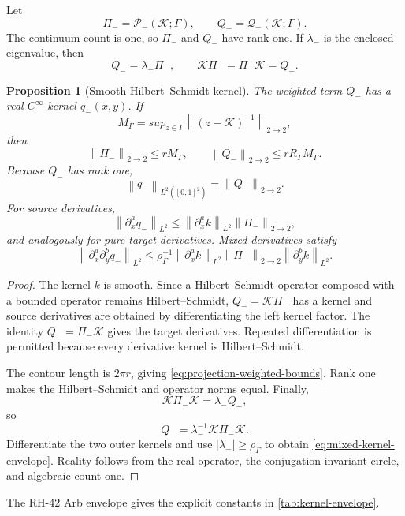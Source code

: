 \documentclass[11pt]{article}
\newtheorem{proposition}[theorem]{Proposition}
\theoremstyle{definition}
\theoremstyle{remark}
\newcommand{\cK}{\mathcal K}
\newcommand{\cQ}{\mathcal Q}
\newcommand{\cP}{\mathcal P}
\newcommand{\norm}[1]{\left\lVert #1\right\rVert}
\begin{document}
Let
\[
 \Pi_-=\cP_-(\cK;\Gamma),
 \qquad Q_-=\cQ_-(\cK;\Gamma).
\]
The continuum count is one, so $\Pi_-$ and $Q_-$ have rank one.  If
$\lambda_-$ is the enclosed eigenvalue, then
\begin{equation}
 Q_-=\lambda_-\Pi_-,
 \qquad
 \cK\Pi_-=\Pi_-\cK=Q_-.
 \label{eq:spectral-identities}
\end{equation}

\begin{proposition}[Smooth Hilbert--Schmidt kernel]
\label{prop:smooth-kernel}
The weighted term $Q_-$ has a real $C^\infty$ kernel $q_-(x,y)$.  If
\[
 M_\Gamma=sup_{z\in\Gamma}\norm{(z-\cK)^{-1}}_{2\to2},
\]
then
\begin{equation}
 \norm{\Pi_-}_{2\to2}\le rM_\Gamma,
 \qquad
 \norm{Q_-}_{2\to2}\le rR_\Gamma M_\Gamma.
 \label{eq:projection-weighted-bounds}
\end{equation}
Because $Q_-$ has rank one,
\[
 \norm{q_-}_{L^2([0,1]^2)}=\norm{Q_-}_{2\to2}.
\]
For source derivatives,
\[
 \norm{\partial_x^a q_-}_{L^2}
 \le\norm{\partial_x^ak}_{L^2}\norm{\Pi_-}_{2\to2},
\]
and analogously for pure target derivatives.  Mixed derivatives satisfy
\begin{equation}
 \norm{\partial_x^a\partial_y^bq_-}_{L^2}
 \le
 \rho_\Gamma^{-1}
 \norm{\partial_x^ak}_{L^2}
 \norm{\Pi_-}_{2\to2}
 \norm{\partial_y^bk}_{L^2}.
 \label{eq:mixed-kernel-envelope}
\end{equation}
\end{proposition}

\begin{proof}
The kernel $k$ is smooth.  Since a Hilbert--Schmidt operator composed with a
bounded operator remains Hilbert--Schmidt, $Q_-=\cK\Pi_-$ has a kernel and
source derivatives are obtained by differentiating the left kernel factor.
The identity $Q_-=\Pi_-\cK$ gives the target derivatives.  Repeated
differentiation is permitted because every derivative kernel is
Hilbert--Schmidt.

The contour length is $2\pi r$, giving
\eqref{eq:projection-weighted-bounds}.  Rank one makes the Hilbert--Schmidt
and operator norms equal.  Finally,
\[
 \cK\Pi_-\cK=\lambda_-Q_-,
\]
so
\[
 Q_-=\lambda_-^{-1}\cK\Pi_-\cK.
\]
Differentiate the two outer kernels and use
$|\lambda_-|\ge\rho_\Gamma$ to obtain
\eqref{eq:mixed-kernel-envelope}.  Reality follows from the real operator,
the conjugation-invariant circle, and algebraic count one.
\end{proof}

The RH-42 Arb envelope gives the explicit constants in
\cref{tab:kernel-envelope}.
\end{document}
